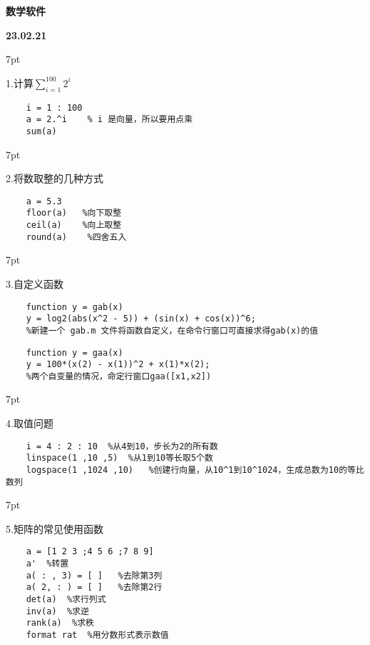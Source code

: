 \documentclass{article} %
\newenvironment{eg}{%
\def\FrameCommand{%
\hspace{1pt}%
{\color{Gray}\vrule width 2pt}%
{\color{egshade}\vrule width 4pt}%
\colorbox{egshade}%
}%
\MakeFramed{\advance\hsize-\width\FrameRestore}%
\noindent\hspace{-4.55pt}%
\begin{adjustwidth}{}{7pt}%
\vspace{2pt}\vspace{2pt}%
\normalfont %
}
{%
\vspace{2pt}\end{adjustwidth}\endMakeFramed%
}
\begin{document}
 
\centerline{\LARGE \textbf{数学软件} }\par 

\noindent \Large \textbf{23.02.21} \par \normalsize
\begin{eg}
    1.计算$\sum \limits _{i=1}^{100} 2^{i}$ \par
\end{eg}
\begin{lstlisting}
    i = 1 : 100
    a = 2.^i    % i 是向量，所以要用点乘
    sum(a)
\end{lstlisting}


\begin{eg}
    2.将数取整的几种方式
\end{eg}
\begin{lstlisting}
    a = 5.3
    floor(a)   %向下取整
    ceil(a)    %向上取整
    round(a)    %四舍五入
\end{lstlisting}

\begin{eg}
    3.自定义函数
\end{eg}
\begin{lstlisting}
    function y = gab(x)
    y = log2(abs(x^2 - 5)) + (sin(x) + cos(x))^6; 
    %新建一个 gab.m 文件将函数自定义，在命令行窗口可直接求得gab(x)的值
\end{lstlisting}
\begin{lstlisting}
    function y = gaa(x)
    y = 100*(x(2) - x(1))^2 + x(1)*x(2);
    %两个自变量的情况，命定行窗口gaa([x1,x2])
\end{lstlisting}

\begin{eg}
    4.取值问题
\end{eg}
\begin{lstlisting}
    i = 4 : 2 : 10  %从4到10，步长为2的所有数
    linspace(1 ,10 ,5)  %从1到10等长取5个数
    logspace(1 ,1024 ,10)   %创建行向量，从10^1到10^1024，生成总数为10的等比数列
\end{lstlisting}

\begin{eg}
    5.矩阵的常见使用函数
\end{eg}
\begin{lstlisting}
    a = [1 2 3 ;4 5 6 ;7 8 9]
    a'  %转置
    a( : , 3) = [ ]   %去除第3列
    a( 2, : ) = [ ]   %去除第2行
    det(a)  %求行列式
    inv(a)  %求逆
    rank(a)  %求秩
    format rat  %用分数形式表示数值
\end{lstlisting}
\end{document}
